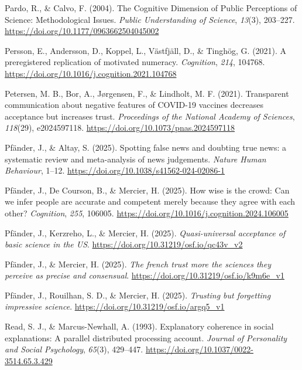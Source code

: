 \documentclass[
  jou,
  floatsintext,
  longtable,
  nolmodern,
  notxfonts,
  notimes,
  colorlinks=true,linkcolor=blue,citecolor=blue,urlcolor=blue]{apa7}
\newlength{\cslhangindent}
\newenvironment{CSLReferences}[2] %
 {\begin{list}{}{%
  \setlength{\itemindent}{0pt}
  \setlength{\leftmargin}{0pt}
  \setlength{\parsep}{0pt}
  \ifodd #1
   \setlength{\leftmargin}{\cslhangindent}
   \setlength{\itemindent}{-1\cslhangindent}
  \fi
  \setlength{\itemsep}{#2\baselineskip}}}
 {\end{list}}
\begin{document}
\begin{CSLReferences}{1}{0}
Pardo, R., \& Calvo, F. (2004). The Cognitive Dimension of Public
Perceptions of Science: Methodological Issues. \emph{Public
Understanding of Science}, \emph{13}(3), 203--227.
\url{https://doi.org/10.1177/0963662504045002}

Persson, E., Andersson, D., Koppel, L., Västfjäll, D., \& Tinghög, G.
(2021). A preregistered replication of motivated numeracy.
\emph{Cognition}, \emph{214}, 104768.
\url{https://doi.org/10.1016/j.cognition.2021.104768}

Petersen, M. B., Bor, A., Jørgensen, F., \& Lindholt, M. F. (2021).
Transparent communication about negative features of COVID-19 vaccines
decreases acceptance but increases trust. \emph{Proceedings of the
National Academy of Sciences}, \emph{118}(29), e2024597118.
\url{https://doi.org/10.1073/pnas.2024597118}

Pfänder, J., \& Altay, S. (2025). Spotting false news and doubting true
news: a systematic review and meta-analysis of news judgements.
\emph{Nature Human Behaviour}, 1--12.
\url{https://doi.org/10.1038/s41562-024-02086-1}

Pfänder, J., De Courson, B., \& Mercier, H. (2025). How wise is the
crowd: Can we infer people are accurate and competent merely because
they agree with each other? \emph{Cognition}, \emph{255}, 106005.
\url{https://doi.org/10.1016/j.cognition.2024.106005}

Pfänder, J., Kerzreho, L., \& Mercier, H. (2025). \emph{Quasi-universal
acceptance of basic science in the US}.
\url{https://doi.org/10.31219/osf.io/qc43v_v2}

Pfänder, J., \& Mercier, H. (2025). \emph{The french trust more the
sciences they perceive as precise and consensual}.
\url{https://doi.org/10.31219/osf.io/k9m6e_v1}

Pfänder, J., Rouilhan, S. D., \& Mercier, H. (2025). \emph{Trusting but
forgetting impressive science}.
\url{https://doi.org/10.31219/osf.io/argq5_v1}

Read, S. J., \& Marcus-Newhall, A. (1993). Explanatory coherence in
social explanations: A parallel distributed processing account.
\emph{Journal of Personality and Social Psychology}, \emph{65}(3),
429--447. \url{https://doi.org/10.1037/0022-3514.65.3.429}


\end{CSLReferences}
\end{document}

